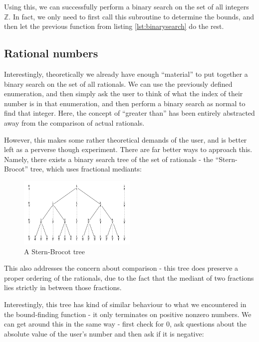 \documentclass{article}
\begin{document}
    Using this, we can successfully perform a binary search on the set of all
    integers $\mathbb{Z}$. In fact, we only need to first call this subroutine
    to determine the bounds, and then let the previous function from listing
    \ref{lst:binarysearch} do the rest.

    \subsection{Rational numbers}

    Interestingly, theoretically we already have enough ``material'' to put
    together a binary search on the set of all rationals. We can use the
    previously defined enumeration, and then simply ask the user to think of
    what the index of their number is in that enumeration, and then perform a
    binary search as normal to find that integer. Here, the concept of
    ``greater than'' has been entirely abstracted away from the comparison of
    actual rationals.
    
    However, this makes some rather theoretical demands of the user, and is
    better left as a perverse though experiment. There are far better ways to
    approach this. Namely, there exists a binary search tree of the set of
    rationals - the ``Stern-Brocot'' tree, which uses fractional mediants:

    \begin{figure}[h]
        \includegraphics[width=0.5\textwidth]{sternbrocot}
        \centering
        \caption{A Stern-Brocot tree}
	\end{figure}

    This also addresses the concern about comparison - this tree does preserve
    a proper ordering of the rationals, due to the fact that the mediant of two
    fractions lies strictly in between those fractions.

    Interestingly, this tree has kind of similar behaviour to what we
    encountered in the bound-finding function - it only terminates on positive
    nonzero numbers. We can get around this in the same way - first check for
    0, ask questions about the absolute value of the user's number and then ask
    if it is negative:
\end{document}
